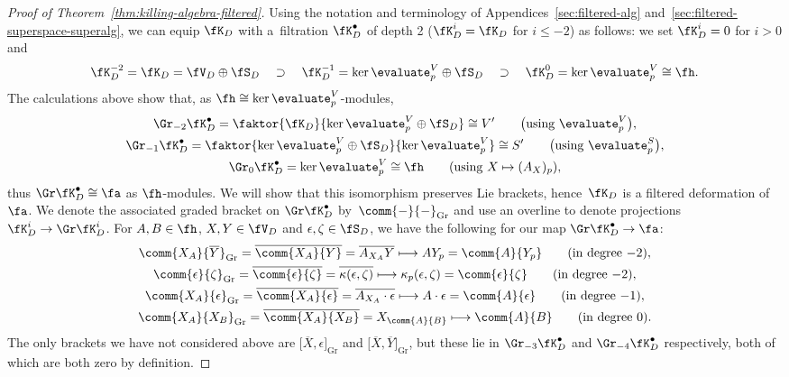 \begin{proof}[Proof of Theorem~\ref{thm:killing-algebra-filtered}]
	Using the notation and terminology of Appendices~\ref{sec:filtered-alg} and~\ref{sec:filtered-superspace-superalg}, we can equip $\fK_D$ with a~filtration $\fK_D^\bullet$ of depth 2 ($\fK_D^i = \fK_D$ for $i\leq-2$) as follows: we set $\fK_D^i = 0$ for $i>0$ and
	\[
		\fK_D^{-2}=\fK_D = \fV_D\oplus\fS_D \quad \supset \quad
		\fK_D^{-1} = \ker\evaluate^V_p\oplus \fS_D \quad \supset \quad
		\fK_D^0 = \ker\evaluate^V_p\cong \fh.
	\]
	The calculations above show that, as $\fh\cong\ker\evaluate^V_p$-modules,
	\begin{gather*}
		\Gr_{-2}\fK_D^\bullet = \faktor{\fK_D}{\ker\evaluate^V_p\oplus\fS_D} \cong V' \qquad \text{\big(using $\evaluate^V_p$\big)},	\\
		\Gr_{-1}\fK_D^\bullet = \faktor{\ker\evaluate^V_p\oplus\fS_D}{\ker\evaluate^V_p} \cong S'	\qquad \text{\big(using $\evaluate^{S}_p$\big)},	\\
		\Gr_0 \fK_D^\bullet = \ker\evaluate^V_p \cong \fh \qquad\text{(using $X\mapsto (A_X)_p$)},
	\end{gather*}
	thus $\Gr\fK_D^\bullet\cong\fa$ as $\fh$-modules. We will show that this isomorphism preserves Lie brackets, hence~$\fK_D$ is a filtered deformation of $\fa$. We denote the associated graded bracket on $\Gr\fK_D^\bullet$ by~$\comm{-}{-}_{\mathrm{Gr}}$ and use an overline to denote projections $\fK_D^i\to\Gr\fK_D^i$. For $A,B\in\fh$, $X,Y\in\fV_D$ and $\epsilon,\zeta\in\fS_D$, we have the following for our map $\Gr\fK_D^\bullet\to\fa$:
	\begin{gather*}
		\comm{X_A}{\overline{Y}}_{\mathrm{Gr}} = \overline{\comm{X_A}{Y}} = \overline{A_{X_A}Y}
			 \longmapsto 	 A Y_p = \comm{A}{Y_p}	\qquad (\text{in degree $-2$}),	\\
		\comm{\epsilon}{\zeta}_{\mathrm{Gr}} = \overline{\comm{\epsilon}{\zeta}} = \overline{\kappa(\epsilon,\zeta)}
			 \longmapsto 	 \kappa_p(\epsilon,\zeta) = \comm{\epsilon}{\zeta}	\qquad (\text{in degree $-2$}),	\\
		\comm{X_A}{\epsilon}_{\mathrm{Gr}} = \overline{\comm{X_A}{\epsilon}} = \overline{A_{X_A}\cdot\epsilon}
			 \longmapsto 	 A\cdot \epsilon = \comm{A}{\epsilon}	\qquad (\text{in degree $-1$}),	\\
		\comm{X_A}{X_B}_{\mathrm{Gr}} = \overline{\comm{X_A}{X_B}} = X_{\comm{A}{B}}
		 \longmapsto 	 \comm{A}{B}	\qquad (\text{in degree $0$}).
	\end{gather*}
	The only brackets we have not considered above are $\big[\overline{X},\epsilon\big]_{\mathrm{Gr}}$ and $\big[\overline{X},\overline{Y}\big]_{\mathrm{Gr}}$, but these lie in $\Gr_{-3}\fK_D^\bullet$ and $\Gr_{-4}\fK_D^\bullet$ respectively, both of which are both zero by definition.
	\end{proof}
	
